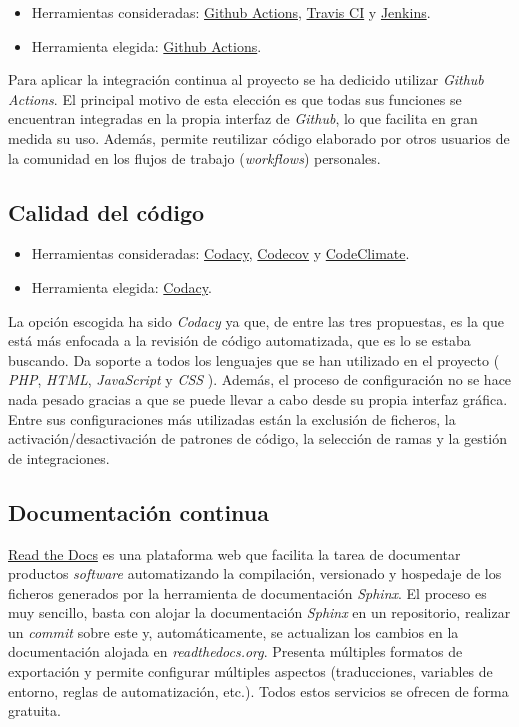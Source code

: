 \begin{itemize}
\tightlist
\item
  Herramientas consideradas:
  \href{https://github.com/features/actions}{Github Actions},
  \href{https://travis-ci.org/}{Travis CI} y
  \href{https://jenkins.io/}{Jenkins}.
\item
  Herramienta elegida: \href{https://github.com/features/actions}{Github
  Actions}.
\end{itemize}

Para aplicar la integración continua al proyecto se ha dedicido utilizar
\emph{Github Actions}. El principal motivo de esta elección es que todas
sus funciones se encuentran integradas en la propia interfaz de
\emph{Github}, lo que facilita en gran medida su uso. Además, permite
reutilizar código elaborado por otros usuarios de la comunidad en los
flujos de trabajo (\emph{workflows}) personales.

\subsection{Calidad del código}

\begin{itemize}
\tightlist
\item
  Herramientas consideradas: \href{https://codacy.com}{Codacy},
  \href{https://codecov.io/}{Codecov} y
  \href{https://codeclimate.com/}{CodeClimate}.
\item
  Herramienta elegida: \href{https://codacy.com}{Codacy}.
\end{itemize}

La opción escogida ha sido \emph{Codacy} ya que, de entre las tres
propuestas, es la que está más enfocada a la revisión de código
automatizada, que es lo se estaba buscando. Da soporte a todos los
lenguajes que se han utilizado en el proyecto ( \emph{PHP}, \emph{HTML},
\emph{JavaScript} y \emph{CSS} ). Además, el proceso de configuración no
se hace nada pesado gracias a que se puede llevar a cabo desde su propia
interfaz gráfica. Entre sus configuraciones más utilizadas están la
exclusión de ficheros, la activación/desactivación de patrones de
código, la selección de ramas y la gestión de integraciones.

\subsection{Documentación continua}

\href{https://readthedocs.org/}{Read the Docs} es una plataforma web que
facilita la tarea de documentar productos \emph{software} automatizando
la compilación, versionado y hospedaje de los ficheros generados por la
herramienta de documentación \emph{Sphinx}. El proceso es muy sencillo,
basta con alojar la documentación \emph{Sphinx} en un repositorio,
realizar un \emph{commit} sobre este y, automáticamente, se actualizan
los cambios en la documentación alojada en \emph{readthedocs.org}.
Presenta múltiples formatos de exportación y permite configurar
múltiples aspectos (traducciones, variables de entorno, reglas de
automatización, etc.). Todos estos servicios se ofrecen de forma
gratuita.

